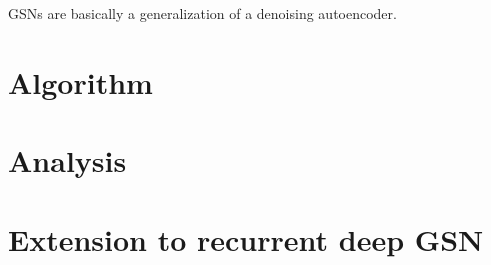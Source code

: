 GSNs are basically a generalization of a denoising autoencoder.
\section{Algorithm}

\section{Analysis}

\section{Extension to recurrent deep GSN}